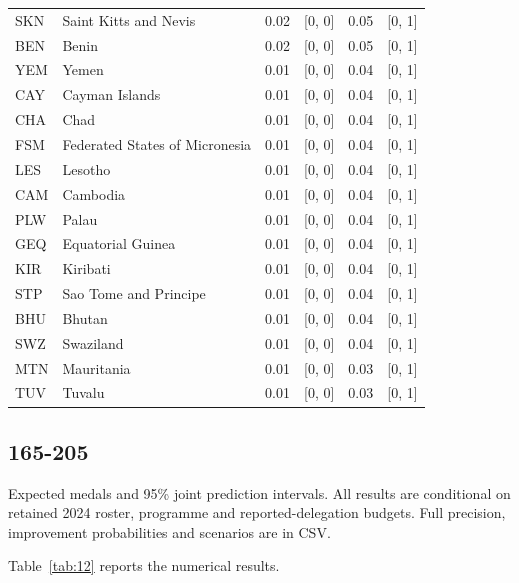 \documentclass[11pt,a4paper]{article}
\begin{document}
{\begin{longtable}{@{}L{1.098cm} L{4.464cm} R{1.463cm} R{2.195cm} R{1.610cm} R{2.342cm}@{}}
SKN & Saint Kitts and Nevis & 0.02 & [0, 0] & 0.05 & [0, 1]\\
BEN & Benin & 0.02 & [0, 0] & 0.05 & [0, 1]\\
YEM & Yemen & 0.01 & [0, 0] & 0.04 & [0, 1]\\
CAY & Cayman Islands & 0.01 & [0, 0] & 0.04 & [0, 1]\\
CHA & Chad & 0.01 & [0, 0] & 0.04 & [0, 1]\\
FSM & Federated States of Micronesia & 0.01 & [0, 0] & 0.04 & [0, 1]\\
LES & Lesotho & 0.01 & [0, 0] & 0.04 & [0, 1]\\
CAM & Cambodia & 0.01 & [0, 0] & 0.04 & [0, 1]\\
PLW & Palau & 0.01 & [0, 0] & 0.04 & [0, 1]\\
GEQ & Equatorial Guinea & 0.01 & [0, 0] & 0.04 & [0, 1]\\
KIR & Kiribati & 0.01 & [0, 0] & 0.04 & [0, 1]\\
STP & Sao Tome and Principe & 0.01 & [0, 0] & 0.04 & [0, 1]\\
BHU & Bhutan & 0.01 & [0, 0] & 0.04 & [0, 1]\\
SWZ & Swaziland & 0.01 & [0, 0] & 0.04 & [0, 1]\\
MTN & Mauritania & 0.01 & [0, 0] & 0.03 & [0, 1]\\
TUV & Tuvalu & 0.01 & [0, 0] & 0.03 & [0, 1]\\
\bottomrule
\end{longtable}}
\par{}
\clearpage
\subsection*{165-205}
Expected medals and 95\% joint prediction intervals. All results are conditional on retained 2024 roster, programme and reported-delegation budgets. Full precision, improvement probabilities and scenarios are in CSV.

Table~\ref{tab:12} reports the numerical results.
\end{document}
